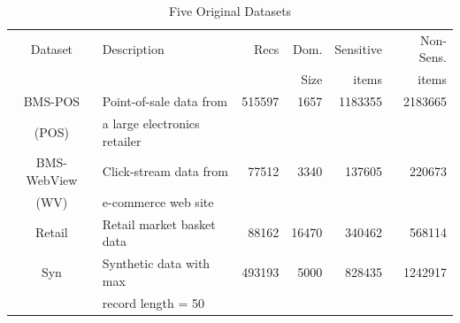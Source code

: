 \begin{table}[tb]
\small
\centering
\caption{Five Original Datasets}
\begin{tabular}{|c|l|r|r|r|r|} \hline
Dataset	& Description & Recs & Dom. & Sensitive & Non-Sens.\\
& & & Size & items & items  \\ \hline \hline
BMS-POS &Point-of-sale data from &515597 & 1657&1183355 &  2183665\\
(POS)	& a large electronics retailer   &	&	&	& \\ \hline
BMS-WebView &Click-stream data from &77512 & 3340& 137605 & 220673  \\
(WV) & e-commerce web site  & &  & & \\ \hline
Retail &  Retail market basket data   & 88162&16470 &340462 & 568114  \\ \hline
Syn & Synthetic data with max & 493193 &5000 &828435 & 1242917 \\
 & record length = 50   & & & & \\ \hline
\end{tabular}
\label{tab:datasets}
\end{table}

